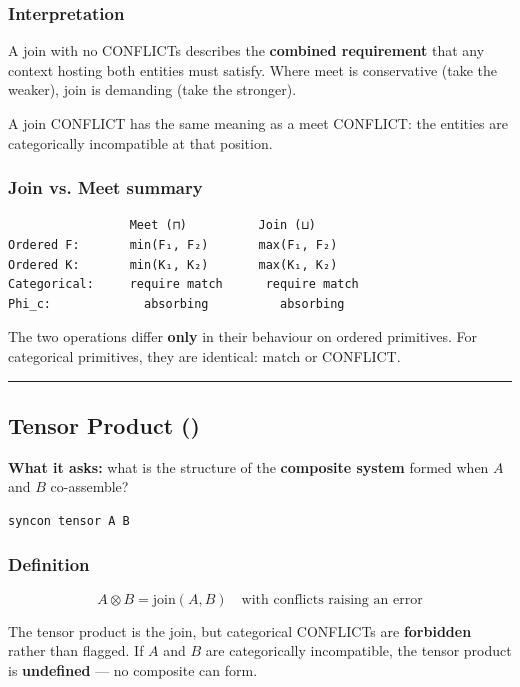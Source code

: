 \documentclass[12pt,a4paper]{article}
\begin{document}
\subsubsection{Interpretation}

A join with no CONFLICTs describes the \textbf{combined requirement} that any context hosting both entities must satisfy. Where meet is conservative (take the weaker), join is demanding (take the stronger).

A join CONFLICT has the same meaning as a meet CONFLICT: the entities are categorically incompatible at that position.

\subsubsection{Join vs. Meet summary}

\begin{lstlisting}
                 Meet (⊓)          Join (⊔)
Ordered F:       min(F₁, F₂)       max(F₁, F₂)
Ordered K:       min(K₁, K₂)       max(K₁, K₂)
Categorical:     require match      require match
Phi_c:             absorbing          absorbing
\end{lstlisting}

The two operations differ \textbf{only} in their behaviour on ordered primitives. For categorical primitives, they are identical: match or CONFLICT.

\begin{center}
\rule{0.5\textwidth}{0.4pt}
\end{center}

\subsection{Tensor Product (\otimes)}

\textbf{What it asks:} what is the structure of the \textbf{composite system} formed when $A$ and $B$ co-assemble?

\begin{lstlisting}
syncon tensor A B
\end{lstlisting}

\subsubsection{Definition}

\[A \otimes B = \text{join}(A, B) \quad \text{with conflicts raising an error}\]

The tensor product is the join, but categorical CONFLICTs are \textbf{forbidden} rather than flagged. If $A$ and $B$ are categorically incompatible, the tensor product is \textbf{undefined} --- no composite can form.
\end{document}
